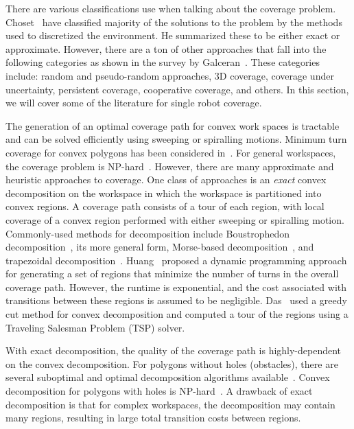 \documentclass[../main.tex]{subfiles}
\begin{document}
There are various classifications use when talking about the coverage problem. Choset~\cite{choset2000coverage} have classified majority of the solutions to the problem by the methods used to discretized the environment. He summarized these to be either exact or approximate. However, there are a ton of other approaches that fall into the following categories as shown in the survey by Galceran~\cite{galceran2013survey}. These categories include: random and pseudo-random approaches, 3D coverage, coverage under uncertainty, persistent coverage, cooperative coverage, and others. In this section, we will cover some of the literature for single robot coverage.

The generation of an optimal coverage path for convex work spaces is tractable and can be solved efficiently using sweeping or spiralling motions. Minimum turn coverage for convex polygons has been considered in~\cite{maza2007multiple}. For general workspaces, the coverage problem is NP-hard~\cite{arkin2000approximation}. However, there are many approximate and heuristic approaches to coverage. One class of approaches is an \emph{exact} convex decomposition on the workspace in which the workspace is partitioned into convex regions. A coverage path consists of a tour of each region, with local coverage of a convex region performed with either sweeping or spiralling motion. Commonly-used methods for decomposition include Boustrophedon decomposition~\cite{Choset1998coverage}, its more general form, Morse-based decomposition~\cite{Acar2002morse}, and trapezoidal decomposition~\cite{Oksanen2009coverage}. Huang~\cite{Huang2001optimal} proposed a dynamic programming approach for generating a set of regions that minimize the number of turns in the overall coverage path. However, the runtime is exponential, and the cost associated with transitions between these regions is assumed to be negligible. Das~\cite{das2014mapping} used a greedy cut method for convex decomposition and computed a tour of the regions using a Traveling Salesman Problem (TSP) solver.

With exact decomposition, the quality of the coverage path is highly-dependent on the convex decomposition. For polygons without holes (obstacles), there are several suboptimal and optimal decomposition algorithms available~\cite{keil2000polygon}. Convex decomposition for polygons with holes is NP-hard~\cite{lingas1982power}. A drawback of exact decomposition is that for complex workspaces, the decomposition may contain many regions, resulting in large total transition costs between regions.
\end{document}
